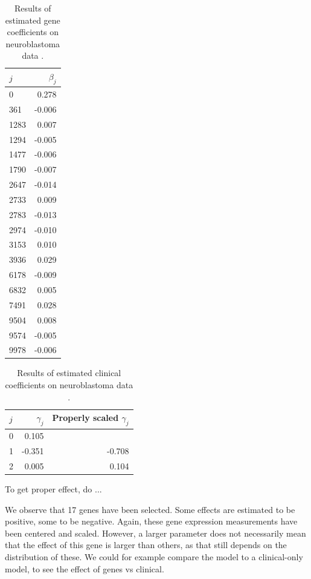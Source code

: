 \begin{table}
\caption{Results of estimated gene coefficients on neuroblastoma data \citep{oberthuer-data}.}
\label{tab:oberthuer-beta}
\begin{tabular}{l|r}
$j$ & $\beta_j$ \\
\hline
0    &  0.278 \\
361  & -0.006 \\
1283 &  0.007 \\
1294 & -0.005 \\
1477 & -0.006 \\
1790 & -0.007 \\
2647 & -0.014 \\
2733 &  0.009 \\
2783 & -0.013 \\
2974 & -0.010 \\
3153 &  0.010 \\
3936 &  0.029 \\
6178 & -0.009 \\
6832 &  0.005 \\
7491 &  0.028 \\
9504 &  0.008 \\
9574 & -0.005 \\
9978 & -0.006
\end{tabular}
\end{table}

\begin{table}
\caption{Results of estimated clinical coefficients on neuroblastoma data \citep{oberthuer-data}.}
\label{tab:oberthuer-gamma}
\begin{tabular}{l|rr}
$j$ & $\gamma_j$ & Properly scaled $\gamma_j$\\
\hline
0 &  0.105 &  \\
1 &  -0.351 & -0.708 \\
2 &   0.005 & 0.104
\end{tabular}
\end{table}

To get proper effect, do ...

We observe that 17 genes have been selected. Some effects are estimated to be positive, some to be negative.
Again, these gene expression measurements have been centered and scaled.
However, a larger parameter does not necessarily mean that the effect of this gene is larger than others, as that still depends on the distribution of these.
We could for example compare the model to a clinical-only model, to see the effect of genes vs clinical.

